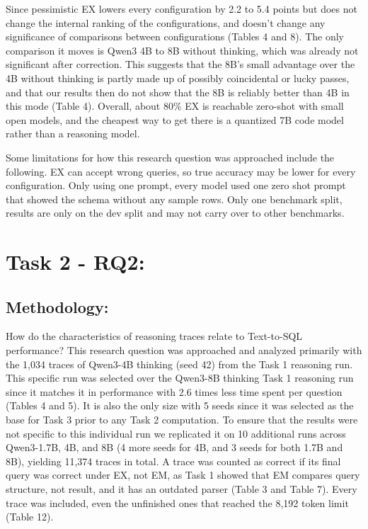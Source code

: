 Since pessimistic EX lowers every configuration by 2.2 to 5.4 points but does not change the internal ranking of the configurations, and doesn't change any significance of comparisons between configurations (Tables 4 and 8). The only comparison it moves is Qwen3 4B to 8B without thinking, which was already not significant after correction. This suggests that the 8B's small advantage over the 4B without thinking is partly made up of possibly coincidental or lucky passes, and that our results then do not show that the 8B is reliably better than 4B in this mode (Table 4). Overall, about 80\% EX is reachable zero-shot with small open models, and the cheapest way to get there is a quantized 7B code model rather than a reasoning model.

Some limitations for how this research question was approached include the following. EX can accept wrong queries, so true accuracy may be lower for every configuration. Only using one prompt, every model used one zero shot prompt that showed the schema without any sample rows. Only one benchmark split, results are only on the dev split and may not carry over to other benchmarks.

\FloatBarrier
\clearpage
\section*{Task 2 - RQ2:}

\FloatBarrier
\subsection*{Methodology:}

How do the characteristics of reasoning traces relate to Text-to-SQL performance? This research question was approached and analyzed primarily with the 1,034 traces of Qwen3-4B thinking (seed 42) from the Task 1 reasoning run. This specific run was selected over the Qwen3-8B thinking Task 1 reasoning run since it matches it in performance with 2.6 times less time spent per question (Tables 4 and 5). It is also the only size with 5 seeds since it was selected as the base for Task 3 prior to any Task 2 computation. To ensure that the results were not specific to this individual run we replicated it on 10 additional runs across Qwen3-1.7B, 4B, and 8B (4 more seeds for 4B, and 3 seeds for both 1.7B and 8B), yielding 11,374 traces in total. A trace was counted as correct if its final query was correct under EX, not EM, as Task 1 showed that EM compares query structure, not result, and it has an outdated parser (Table 3 and Table 7). Every trace was included, even the unfinished ones that reached the 8,192 token limit (Table 12).

